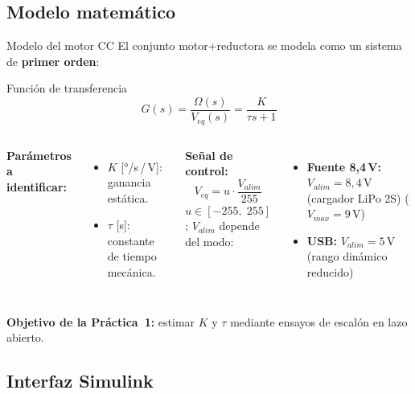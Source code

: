 \documentclass{beamer}
\begin{document}
\subsection{Modelo matemático}

\begin{frame}{Modelo del motor CC}
El conjunto motor+reductora se modela como un sistema de \textbf{primer orden}:
\begin{block}{Función de transferencia}
\[
  G(s) = \frac{\Omega(s)}{V_{eq}(s)} = \frac{K}{\tau s + 1}
\]
\end{block}
\vspace{4pt}
\begin{columns}[T]
  \textbf{Parámetros a identificar:}
  \begin{itemize}
    \item $K$ [°/s\,/\,V]: ganancia estática.
    \item $\tau$ [s]: constante de tiempo mecánica.
  \end{itemize}
  \textbf{Señal de control:}
  \[ V_{eq} = u \cdot \frac{V_{alim}}{255} \]
  $u\in[-255,\;255]$; $V_{alim}$ depende del modo:
  \begin{itemize}
    \setlength{\itemsep}{2pt}\setlength{\topsep}{2pt}
    \item \textbf{Fuente 8{,}4\,V:} $V_{alim}=8{,}4\,\text{V}$ (cargador LiPo 2S)
          ($V_{max}=9\,\text{V}$)
    \item \textbf{USB:} $V_{alim}=5\,\text{V}$
          (rango dinámico reducido)
  \end{itemize}
\end{columns}
\vspace{6pt}
\textbf{Objetivo de la Práctica~1:} estimar $K$ y $\tau$ mediante ensayos
de escalón en lazo abierto.
\end{frame}

\subsection{Interfaz Simulink}
\end{document}
